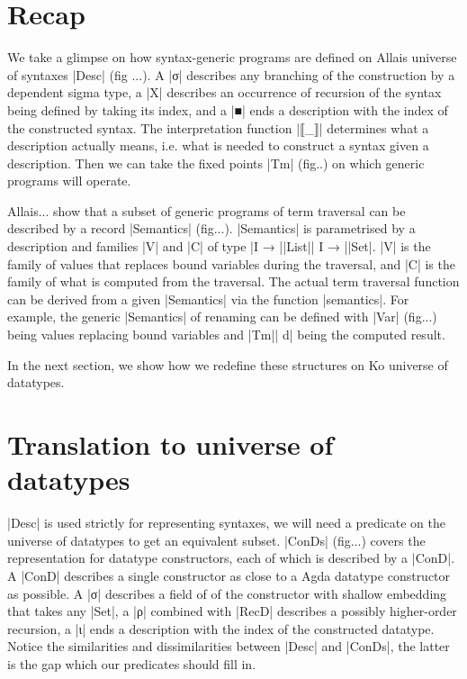 \documentclass[sigplan,review,fleqn]{acmart}
\renewcommand{\verb}{\collectverb{\color{AgdaFunction}}}
\newcommand{\con}{\collectverb{\color{AgdaInductiveConstructor}}}
\newcommand{\name}{\collectverb{\color{AgdaSymbol}}}
\begin{document}
\section{Recap}
We take a glimpse on how syntax-generic programs are defined on Allais universe of syntaxes \verb|Desc| (fig ...).
A \con|σ| describes any branching of the construction by a dependent sigma type, a \con|X| describes an occurrence of recursion of the syntax being defined by taking its index, and a \con|■| ends a description with the index of the constructed syntax.
The interpretation function \verb|⟦_⟧| determines what a description actually means, i.e. what is needed to construct a syntax given a description.
Then we can take the fixed points \verb|Tm| (fig..) on which generic programs will operate.

Allais... show that a subset of generic programs of term traversal can be described by a record \verb|Semantics| (fig...).
\verb|Semantics| is parametrised by a description and families \name|V| and \name|C| of type \name|I → |\verb|List|\name| I → |\verb|Set|.
\name|V| is the family of values that replaces bound variables during the traversal, and \name|C| is the family of what is computed from the traversal.
The actual term traversal function can be derived from a given \verb|Semantics| via the function \verb|semantics|.
For example, the generic \verb|Semantics| of renaming can be defined with \verb|Var| (fig...) being values replacing bound variables and \verb|Tm|\name| d| being the computed result.

In the next section, we show how we redefine these structures on Ko universe of datatypes. 


\section{Translation to universe of datatypes}
\verb|Desc| is used strictly for representing syntaxes, we will need a predicate on the universe of datatypes to get an equivalent subset.
\verb|ConDs| (fig...) covers the representation for datatype constructors, each of which is described by a \verb|ConD|.
A \verb|ConD| describes a single constructor as close to a Agda datatype constructor as possible.
A \con|σ| describes a field of of the constructor with shallow embedding that takes any \verb|Set|, a \con|ρ| combined with \verb|RecD| describes a possibly higher-order recursion, a \con|ι| ends a description with the index of the constructed datatype.
Notice the similarities and dissimilarities between \verb|Desc| and \verb|ConDs|, the latter is the gap which our predicates should fill in. 
\end{document}
